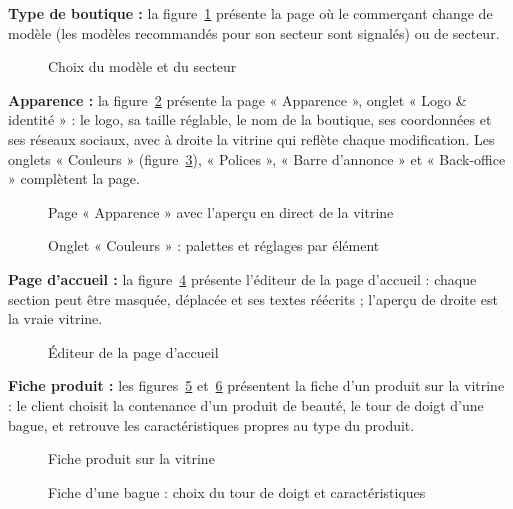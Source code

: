 \textbf{Type de boutique :} la figure~\ref{fig:ui-configuration} présente la page où le commerçant change de modèle (les modèles recommandés pour son secteur sont signalés) ou de secteur.
\begin{figure}[H]
    \centering
    \caption{Choix du modèle et du secteur}
    \label{fig:ui-configuration}
\end{figure}

\textbf{Apparence :} la figure~\ref{fig:ui-apparence} présente la page « Apparence », onglet « Logo \& identité » : le logo, sa taille réglable, le nom de la boutique, ses coordonnées et ses réseaux sociaux, avec à droite la vitrine qui reflète chaque modification. Les onglets « Couleurs » (figure~\ref{fig:ui-theme}), « Polices », « Barre d'annonce » et « Back-office » complètent la page.
\begin{figure}[H]
    \centering
    \caption{Page « Apparence » avec l'aperçu en direct de la vitrine}
    \label{fig:ui-apparence}
\end{figure}
\begin{figure}[H]
    \centering
    \caption{Onglet « Couleurs » : palettes et réglages par élément}
    \label{fig:ui-theme}
\end{figure}

\textbf{Page d'accueil :} la figure~\ref{fig:ui-page-accueil} présente l'éditeur de la page d'accueil : chaque section peut être masquée, déplacée et ses textes réécrits ; l'aperçu de droite est la vraie vitrine.
\begin{figure}[H]
    \centering
    \caption{Éditeur de la page d'accueil}
    \label{fig:ui-page-accueil}
\end{figure}

\textbf{Fiche produit :} les figures~\ref{fig:ui-fiche} et~\ref{fig:ui-fiche-bijou} présentent la fiche d'un produit sur la vitrine : le client choisit la contenance d'un produit de beauté, le tour de doigt d'une bague, et retrouve les caractéristiques propres au type du produit.
\begin{figure}[H]
    \centering
    \caption{Fiche produit sur la vitrine}
    \label{fig:ui-fiche}
\end{figure}
\begin{figure}[H]
    \centering
    \caption{Fiche d'une bague : choix du tour de doigt et caractéristiques}
    \label{fig:ui-fiche-bijou}
\end{figure}

